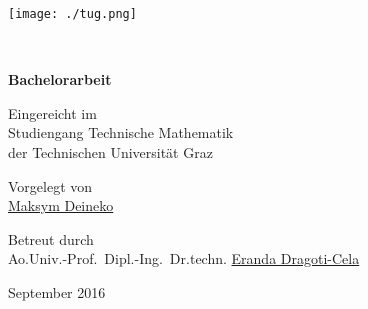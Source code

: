 \documentclass[titlepage]{scrartcl}
\begin{document}
\thispagestyle{empty}


\hfill\texttt{[image: ./tug.png]}

\begin{center}
\vspace{2.6cm}

{}
\\
\vspace{0.54cm}
{}

\vspace{2.4cm}
\vspace{2.1cm}

{\bfseries Bachelorarbeit}

\vspace{0.9cm}
Eingereicht im
\\
Studiengang Technische Mathematik
\\
der Technischen Universität Graz

\vspace{0.9cm}
Vorgelegt von
\\
\href{mailto:deineko@student.tugraz.at}{Maksym Deineko}

\vspace{0.9cm}
Betreut durch
\\
Ao.Univ.-Prof.\ Dipl.-Ing.\ Dr.techn.
\href{mailto:cela@math.tugraz.at}{Eranda Dragoti-Cela}

\vspace{0.9cm}
September 2016

\end{center}
\end{document}
